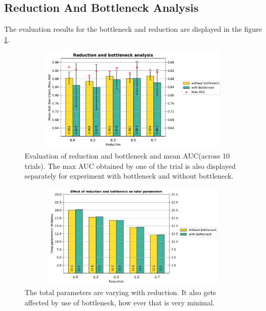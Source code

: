 
\subsection{Reduction And Bottleneck Analysis}
The evaluation results for the bottleneck and reduction are displayed in the figure \ref{fig:compression_and_bottleneck_vs_auc}.

\begin{figure}[ht]
\centering
\includegraphics[width=12cm,height=5cm]{images/densenet/siamese/densenet_siamese_reduction_bottleneck}
\caption{Evaluation of reduction and bottleneck and mean AUC(across 10 trials). The max AUC obtained by one of the trial is also displayed separately for experiment with bottleneck and without bottleneck.}
\label{fig:compression_and_bottleneck_vs_auc}
\end{figure}

\begin{figure}[ht]
\centering
\includegraphics[width=12cm,height=5cm]{images/densenet/siamese/densenet_siamese_params_reduction_bottleneck}
\caption{The total parameters are varying with reduction. It also gets affected by use of bottleneck, how ever that is very minimal.}
\label{fig:compression_and_bn_vs_parameters}
\end{figure}

